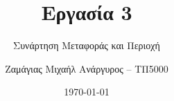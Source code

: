 \documentclass[12pt]{turabian-researchpaper}
\title{Εργασία 3}
\subtitle{Συνάρτηση Μεταφοράς και Περιοχή }
\author{Ζαμάγιας Μιχαήλ Ανάργυρος -- ΤΠ5000}
\date{\today}
\begin{document}
\begin{titlepage}
    \maketitle
\end{titlepage}
\end{document}
